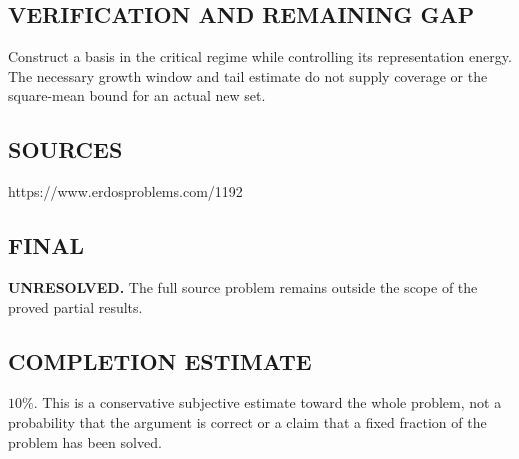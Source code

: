 \subsection*{VERIFICATION AND REMAINING GAP}
Construct a basis in the critical regime while controlling its representation
energy. The necessary growth window and tail estimate do not supply coverage
or the square-mean bound for an actual new set.

\subsection*{SOURCES}
https://www.erdosproblems.com/1192

\subsection*{FINAL}
\textbf{UNRESOLVED.} The full source problem remains outside the scope of the proved partial results.

\subsection*{COMPLETION ESTIMATE}
$10\%$. This is a conservative subjective estimate toward the whole problem, not a probability that the argument is correct or a claim that a fixed fraction of the problem has been solved.
